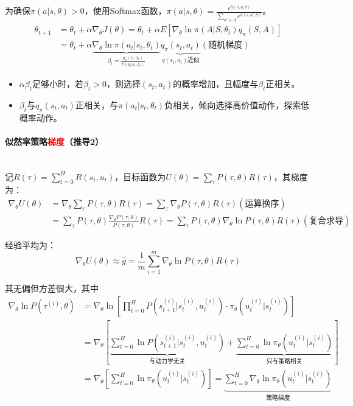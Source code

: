 \documentclass[
12pt, %
a4paper, 
oneside, %
]{scrartcl}
\begin{document}
为确保$ \pi(a|s, \theta) > 0 $，使用Softmax函数，$ \pi(a|s, \theta) = \frac{e^{h(s, a, \theta)}}{\sum_{a' \in A} e^{h(s, a', \theta)}} $。
\begin{align*}
\theta_{t + 1} &= \theta_t + \alpha\nabla_\theta J(\theta) = \theta_t + \alpha E[\nabla_\theta \ln \pi(A|S, \theta_t) q_\pi(S, A)] \\
&= \theta_t + \alpha \underbrace{\nabla_\theta \ln \pi(a_t|s_t, \theta_t)}_{\beta_t = \frac{q_\pi(s_t, a_t)}{\pi(a_t|s_t, \theta_t)}} \underbrace{q_\pi(s_t, a_t)}_{q(s_t, a_t)\text{近似}} (\text{随机梯度})
\end{align*}    

\begin{itemize}
\item $ \alpha\beta_t $足够小时，若$ \beta_t > 0 $，则选择$ (s_t, a_t) $的概率增加，且幅度与$ \beta_t $正相关。
\item $ \beta_t $与$ q_{\pi}(s_t, a_t) $正相关，与$ \pi(a_t|s_t, \theta_t) $负相关，倾向选择高价值动作，探索低概率动作。
\end{itemize}
\paragraph{似然率策略\textcolor{red}{梯度}（推导2）}~\\

记$ R(\tau) = \sum_{t = 0}^H R(s_t, u_t) $，目标函数为$ U(\theta) = \sum_{\tau} P(\tau, \theta) R(\tau) $，其梯度为：
\begin{align*}
\nabla_\theta U(\theta) &= \nabla_\theta \sum_{\tau} P(\tau, \theta) R(\tau) = \sum_{\tau} \nabla_\theta P(\tau, \theta) R(\tau) (\text{运算换序}) \\
&= \sum_{\tau} P(\tau, \theta) \frac{\nabla_\theta P(\tau, \theta)}{P(\tau, \theta)} R(\tau) = \sum_{\tau} P(\tau, \theta) \nabla_\theta \ln P(\tau, \theta) R(\tau) (\text{复合求导})
\end{align*}

经验平均为：
$$ \nabla_\theta U(\theta) \approx \hat{g} = \frac{1}{m} \sum_{i = 1}^m \nabla_\theta \ln P(\tau, \theta) R(\tau) $$

其无偏但方差很大，其中
\begin{align*}
\nabla_\theta\ln P(\tau^{(i)}, \theta) &= \nabla_\theta\ln[\prod_{t = 0}^{H} P(s_{t + 1}^{(i)}|s_t^{(i)}, u_t^{(i)}) \cdot \pi_\theta(u_t^{(i)}|s_t^{(i)})] \\
&= \nabla_\theta[\underbrace{\sum_{t = 0}^{H} \ln P(s_{t + 1}^{(i)}|s_t^{(i)}, u_t^{(i)})}_{\text{与动力学无关}} + \underbrace{\sum_{t = 0}^{H} \ln \pi_\theta(u_t^{(i)}|s_t^{(i)})}_{\text{只与策略相关}}] \\
&= \nabla_\theta[\sum_{t = 0}^{H} \ln \pi_\theta(u_t^{(i)}|s_t^{(i)})] = \underbrace{\sum_{t = 0}^{H} \nabla_\theta \ln \pi_\theta(u_t^{(i)}|s_t^{(i)})}_{\text{策略梯度}} 
\end{align*}
\end{document}
